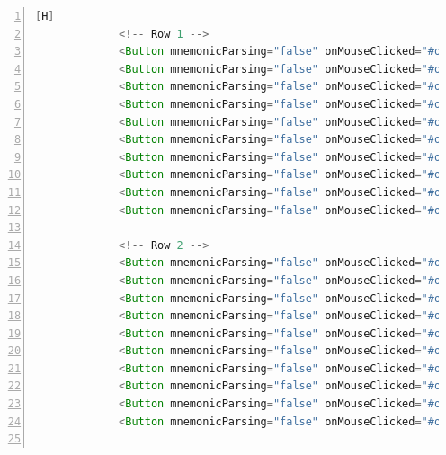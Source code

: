 \documentclass{article}
\begin{document}
\begin{lstlisting}[language=java,caption={Archivo FXML}, numbers=left][H]
             <!-- Row 1 -->
             <Button mnemonicParsing="false" onMouseClicked="#onButtonClick" styleClass="button" text="" GridPane.columnIndex="0" GridPane.rowIndex="1" />
             <Button mnemonicParsing="false" onMouseClicked="#onButtonClick" styleClass="button" text="" GridPane.columnIndex="1" GridPane.rowIndex="1" />
             <Button mnemonicParsing="false" onMouseClicked="#onButtonClick" styleClass="button" text="" GridPane.columnIndex="2" GridPane.rowIndex="1" />
             <Button mnemonicParsing="false" onMouseClicked="#onButtonClick" styleClass="button" text="" GridPane.columnIndex="3" GridPane.rowIndex="1" />
             <Button mnemonicParsing="false" onMouseClicked="#onButtonClick" styleClass="button" text="" GridPane.columnIndex="4" GridPane.rowIndex="1" />
             <Button mnemonicParsing="false" onMouseClicked="#onButtonClick" styleClass="button" text="" GridPane.columnIndex="5" GridPane.rowIndex="1" />
             <Button mnemonicParsing="false" onMouseClicked="#onButtonClick" styleClass="button" text="" GridPane.columnIndex="6" GridPane.rowIndex="1" />
             <Button mnemonicParsing="false" onMouseClicked="#onButtonClick" styleClass="button" text="" GridPane.columnIndex="7" GridPane.rowIndex="1" />
             <Button mnemonicParsing="false" onMouseClicked="#onButtonClick" styleClass="button" text="" GridPane.columnIndex="8" GridPane.rowIndex="1" />
             <Button mnemonicParsing="false" onMouseClicked="#onButtonClick" styleClass="button" text="" GridPane.columnIndex="9" GridPane.rowIndex="1" />

             <!-- Row 2 -->
             <Button mnemonicParsing="false" onMouseClicked="#onButtonClick" styleClass="button" text="" GridPane.columnIndex="0" GridPane.rowIndex="2" />
             <Button mnemonicParsing="false" onMouseClicked="#onButtonClick" styleClass="button" text="" GridPane.columnIndex="1" GridPane.rowIndex="2" />
             <Button mnemonicParsing="false" onMouseClicked="#onButtonClick" styleClass="button" text="" GridPane.columnIndex="2" GridPane.rowIndex="2" />
             <Button mnemonicParsing="false" onMouseClicked="#onButtonClick" styleClass="button" text="" GridPane.columnIndex="3" GridPane.rowIndex="2" />
             <Button mnemonicParsing="false" onMouseClicked="#onButtonClick" styleClass="button" text="" GridPane.columnIndex="4" GridPane.rowIndex="2" />
             <Button mnemonicParsing="false" onMouseClicked="#onButtonClick" styleClass="button" text="" GridPane.columnIndex="5" GridPane.rowIndex="2" />
             <Button mnemonicParsing="false" onMouseClicked="#onButtonClick" styleClass="button" text="" GridPane.columnIndex="6" GridPane.rowIndex="2" />
             <Button mnemonicParsing="false" onMouseClicked="#onButtonClick" styleClass="button" text="" GridPane.columnIndex="7" GridPane.rowIndex="2" />
             <Button mnemonicParsing="false" onMouseClicked="#onButtonClick" styleClass="button" text="" GridPane.columnIndex="8" GridPane.rowIndex="2" />
             <Button mnemonicParsing="false" onMouseClicked="#onButtonClick" styleClass="button" text="" GridPane.columnIndex="9" GridPane.rowIndex="2" />


\end{lstlisting}
\end{document}
